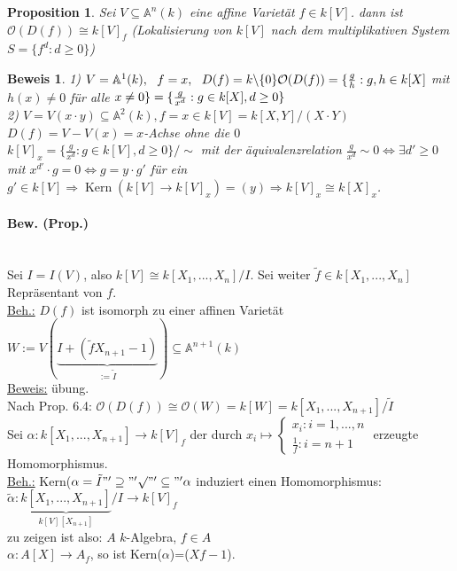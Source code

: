 \documentclass[a4paper,12pt]{report}
\theoremstyle{break}
\newtheorem{Prop}[Def]{Proposition}
\theoremstyle{nonumberbreak}
\newtheorem{Bew}{Beweis}
\theoremstyle{nonumberplain}
\begin{document}
\begin{Prop}
Sei $V\subseteq\mathbb{A}^n(k)$ eine affine Varietät $f\in k[V]$. dann ist $\mathcal{O}(D(f))\cong k[V]_f$ (Lokalisierung von $k[V]$ nach dem multiplikativen System $S=\{f^d: d\geq 0\}$)
\end{Prop}
\begin{Bew}
1) $V=\mathbb{A}^1(k),~~f=x,~~ D(f)=k\backslash \{0\}\\
\mathcal{O}(D(f))=\{\frac{g}{h}: g,h\in k[X]$ mit $h(x)\neq 0$ für alle $x\neq 0\}\\
=\{\frac{g}{x^d}: g\in k[X], d\geq 0\}$\\
2) $V=V(x\cdot y)\subseteq \mathbb{A}^2(k), f=x\in k[V]=k[X,Y]/(X\cdot Y)$\\
$D(f)=V-V(x)= x$-Achse ohne die $0$\\
$k[V]_x=\{\frac{g}{x^d}: g\in k[V], d\geq 0\}/\sim$ mit der äquivalenzrelation $\frac{g}{x^d} \sim 0\Leftrightarrow \exists d'\geq 0$ mit $x^{d'}\cdot g=0\Leftrightarrow g=y\cdot g'$ für ein $g'\in k[V]\Rightarrow \operatorname{Kern}(k[V]\rightarrow k[V]_x)=(y)\Rightarrow k[V]_x\cong k[X]_x$.
\end{Bew}
\paragraph{Bew. (Prop.)}~\\
Sei $I=I(V)$, also $k[V]\cong k[X_1,...,X_n]/I$. Sei weiter $\tilde{f}\in k[X_1,...,X_n]$ Repräsentant von $f$.\\
\underline{Beh.:} $D(f)$ ist isomorph zu einer affinen Varietät $W:=V(\underbrace{I+(\tilde{f}X_{n+1}-1)}_{:=\tilde{I}})\subseteq \mathbb{A}^{n+1}(k)$\\
\underline{Beweis:} übung.\\
Nach Prop. 6.4: $\mathcal{O}(D(f))\cong\mathcal{O}(W)=k[W]=k[X_1,...,X_{n+1}]/\tilde{I}$\\
Sei $\alpha: k[X_1,...,X_{n+1}] \rightarrow k[V]_f$ der durch $x_i\mapsto\begin{cases}
x_i: i=1,...,n\\
\frac{1}{f}: i=n+1
\end{cases}$ erzeugte Homomorphismus.\\
\underline{Beh.:} Kern($\alpha=\tilde{I}\\
"'\supseteq"' \surd\\
"'\subseteq"' \alpha$ induziert einen Homomorphismus: $\tilde{\alpha}:\underbrace{k[X_1,...,X_{n+1}]}_{k[V][X_{n+1}]}/I\rightarrow k[V]_f$\\
zu zeigen ist also: $A$ $k$-Algebra, $f\in A$\\
$\alpha: A[X]\rightarrow A_f$, so ist Kern($\alpha$)=($Xf-1$).

\appendix

\def\indexspace{\par\medskip}
\end{document}
